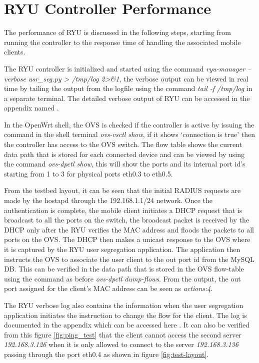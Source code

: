 \section{RYU Controller Performance}
The performance of RYU is discussed in the following steps, starting from running the controller to the response time of handling the associated mobile clients.

The RYU controller is initialized and started using the command \textit{ryu-manager --verbose usr\_seg.py > /tmp/log 2>\&1}, the verbose output can be viewed in real time by tailing the output from the logfile using the command \textit{tail -f /tmp/log} in a separate terminal. The detailed verbose output of RYU can be accessed in the appendix named .
 
In the OpenWrt shell, the OVS is checked if the controller is active by issuing the command in the shell terminal \textit{ovs-vsctl show}, if it shows ‘connection is true’ then the controller has access to the OVS switch. The flow table shows the current data path that is stored for each connected device and can be viewed by using the command \textit{ovs-dpctl show}, this will show the ports and its internal port id’s starting from 1 to 3 for physical ports eth0.3 to eth0.5.

From the testbed layout, it can be seen that the initial RADIUS requests are made by the hostapd through the 192.168.1.1/24 network. Once the authentication is complete, the mobile client initiates a DHCP request that is broadcast to all the ports on the switch, the broadcast packet is received by the DHCP only after the RYU verifies the MAC address and floods the packets to all ports on the OVS. The DHCP then makes a unicast response to the OVS where it is captured by the RYU user segregation application. The application then instructs the OVS to associate the user client to the out port id from the MySQL DB. This can be verified in the data path that is stored in the OVS flow-table using the command as before \textit{ovs-dpctl dump-flows}. From the output, the out port assigned for the client's MAC address can be seen as \textit{actions:4}.

The RYU verbose log also contains the information when the user segregation application initiates the instruction to change the flow for the client. The log is documented in the appendix which can be accessed here . It can also be verified from this figure \ref{fig:ping_test} that the client cannot access the second server \textit{192.168.3.126} when it is only allowed to connect to the server \textit{192.168.3.136} passing through the port eth0.4 as shown in figure \ref{fig:test-layout}.

